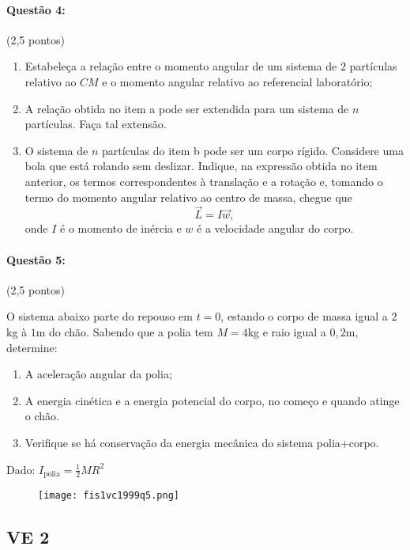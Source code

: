 \documentclass[12pt,a4paper]{article}
\begin{document}
\paragraph{Questão 4:} (2,5 pontos)
\begin{enumerate}[label=\alph*)]
\item Estabeleça a relação entre o momento angular de um sistema de $2$ partículas relativo ao $CM$ e o momento angular relativo ao referencial laboratório;
\item A relação obtida no item a pode ser extendida para um sistema de $n$ partículas. Faça tal extensão.
\item O sistema de $n$ partículas do item b pode ser um corpo rígido. Considere uma bola que está rolando sem deslizar. 
Indique, na expressão obtida no item anterior, os termos correspondentes à translação e a rotação e, tomando o termo do momento angular relativo ao centro de massa, chegue que
$$ \overrightarrow{L}=I\overrightarrow{w},$$
onde $I$ é o momento de inércia e $w$ é a velocidade angular do corpo.
\end{enumerate}

\paragraph{Questão 5:} (2,5 pontos)

O sistema abaixo parte do repouso em $t=0$, estando o corpo de massa igual a $2$kg à $1$m do chão. 
Sabendo que a polia tem $M=4$kg e raio igual a $0,2$m, determine:

\begin{enumerate}[label=\alph*)]
\item A aceleração angular da polia;
\item A energia cinética e a energia potencial do corpo, no começo e quando atinge o chão.
\item Verifique se há conservação da energia mecânica do sistema polia+corpo.
\end{enumerate}

Dado: $I_{\textrm{polia}}=\frac{1}{2}MR^2$

\begin{figure}[ht]
\centering
\texttt{[image: fis1vc1999q5.png]}
\end{figure}

\newpage
\subsection{VE 2}
\end{document}
